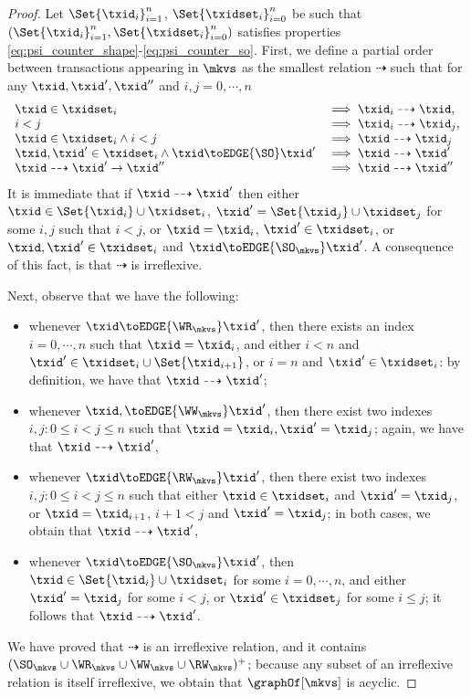 \begin{proof}
Let $\Set{\txid_{i}}_{i=1}^{n}$, $\Set{\txidset_{i}}_{i=0}^{n}$ 
be such that $(\Set{\txid_{i}}_{i=1}^{n}, \Set{\txidset_{i}}_{i=0}^{n})$ 
satisfies properties \eqref{eq:psi_counter_shape}-\eqref{eq:psi_counter_so}. 
First, we define a partial order between transactions appearing in $\mkvs$ 
as the smallest relation $\dashrightarrow$ such that for any $\txid, \txid', \txid''$ and 
$i,j = 0,\cdots, n$
\[
\begin{array}{ll}
\txid \in \txidset_{i} &\implies \txid_{i} \dashrightarrow \txid,\\
i < j &\implies \txid_{i} \dashrightarrow \txid_{j},\\
\txid \in \txidset_{i} \land i < j & \implies \txid \dashrightarrow \txid_{j}\\
\txid, \txid' \in \txidset_{i} \land \txid \toEDGE{\SO} \txid' &\implies \txid \dashrightarrow \txid'\\
\txid \dashrightarrow \txid' \rightarrow \txid'' &\implies \txid \dashrightarrow \txid''
\end{array}
\]
It is immediate that if $\txid \dashrightarrow \txid'$ then either $\txid \in \Set{\txid_{i}} \cup \txidset_i$, 
$\txid' = \Set{\txid_{j}} \cup \txidset_{j}$ for some $i,j$ such that $i < j$, or $\txid = \txid_{i}$, $\txid' \in \txidset_i$, 
or $\txid, \txid' \in \txidset_{i}$ and $\txid \toEDGE{\SO_{\mkvs}} \txid'$. A consequence of this fact, 
is that $\dashrightarrow$ is irreflexive.

Next, observe that we have the following: 
\begin{itemize}
\item whenever $\txid \toEDGE{\WR_{\mkvs}} \txid'$, then 
there exists an index $i = 0,\cdots, n$ such that $\txid = \txid_{i}$, 
and either $i < n$ and $\txid' \in \txidset_{i} \cup \Set{ \txid_{i+1} }$, 
or $i = n$ and $\txid' \in \txidset_{i}$: by definition, we have that $\txid \dashrightarrow \txid'$;
\item whenever $\txid, \toEDGE{\WW_{\mkvs}} \txid'$, 
then there exist two indexes $i, j: 0 \leq i < j \leq n$ such that 
$\txid = \txid_{i}, \txid' = \txid_{j}$; again, we have that $\txid \dashrightarrow \txid'$, 
\item whenever $\txid \toEDGE{\RW_{\mkvs}} \txid'$, then 
there exist two indexes $i, j: 0 \leq i < j \leq n$ such that either 
$\txid \in \txidset_{i}$ and $\txid' = \txid_{j}$, or $\txid = \txid_{i+1}$, 
$i+1 < j$ and $\txid' = \txid_{j}$; in both cases, we obtain that $\txid \dashrightarrow \txid'$,
\item whenever $\txid \toEDGE{\SO_{\mkvs}} \txid'$, then 
$\txid \in \Set{\txid_{i}} \cup \txidset_{i}$ for some $i=0,\cdots,n$, 
and either $\txid' = \txid_{j}$ for some $i < j$,  or $\txid' \in \txidset_{j}$ for 
some $i \leq j$; it follows that $\txid \dashrightarrow \txid'$.
\end{itemize}

We have proved that $\dashrightarrow$ is an irreflexive relation, and it contains $(\SO_{\mkvs} \cup \WR_{\mkvs} \cup \WW_{\mkvs} \cup \RW_{\mkvs})^+$; 
because any subset of an irreflexive relation is itself irreflexive, we obtain that $\graphOf[\mkvs]$ is acyclic.
\end{proof}

